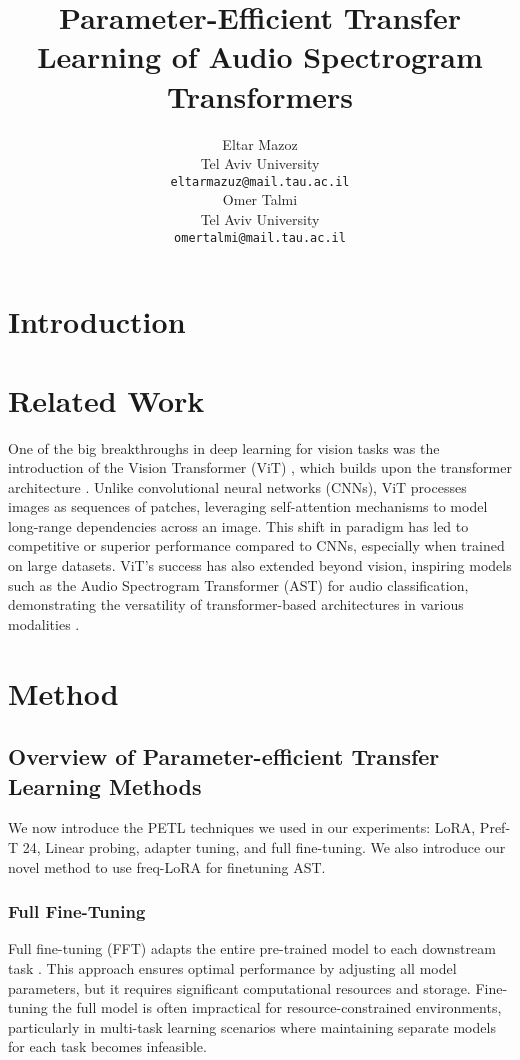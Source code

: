 \documentclass[11pt]{article}
\title{Parameter-Efficient Transfer Learning of Audio Spectrogram Transformers}
\author{Eltar Mazoz \\
  Tel Aviv University \\
  \texttt{eltarmazuz@mail.tau.ac.il} \\\And
  Omer Talmi \\
  Tel Aviv University \\
  \texttt{omertalmi@mail.tau.ac.il} \\}
\begin{document}
\maketitle
\begin{abstract}

\end{abstract}

\section{Introduction}


\section{Related Work}
One of the big breakthroughs in deep learning for vision tasks was the introduction of the Vision Transformer (ViT) \cite{dosovitskiy2020image}, which builds upon the transformer architecture \cite{vaswani2017attention}. Unlike convolutional neural networks (CNNs), ViT processes images as sequences of patches, leveraging self-attention mechanisms to model long-range dependencies across an image. This shift in paradigm has led to competitive or superior performance compared to CNNs, especially when trained on large datasets. ViT’s success has also extended beyond vision, inspiring models such as the Audio Spectrogram Transformer (AST) for audio classification, demonstrating the versatility of transformer-based architectures in various modalities \cite{gong2021ast}.


\section{Method}
\subsection{Overview of Parameter-efficient Transfer Learning Methods}

We now introduce the PETL techniques we used in our experiments: LoRA, Pref-T 24, Linear probing, adapter tuning, and full fine-tuning.
We also introduce our novel method to use freq-LoRA for finetuning AST.

\subsubsection{Full Fine-Tuning}
Full fine-tuning (FFT) adapts the entire pre-trained model to each downstream task \cite{xu2023parameter}. This approach ensures optimal performance by adjusting all model parameters, but it requires significant computational resources and storage. Fine-tuning the full model is often impractical for resource-constrained environments, particularly in multi-task learning scenarios where maintaining separate models for each task becomes infeasible.
\end{document}
